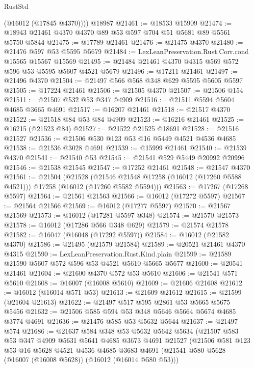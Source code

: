 \begin{lexlean}{RustStd}
\begin{coremodule}
        (@16012 (@17845 @4370))))
    @18987
@21461 := @18533 @15909
@21474 := @18943 @21461 @4370 @4370 @89 @53 @597 @704 @51 @5681 @89 @5561 @5750 @5844
@21475 := @17789 @21461
@21476 := @21475 @4370
@21480 := @21476 @597 @53 @5595 @5679
@21484 := LexLeanPreservation.Rust.Corr.cond @15565 @15567 @15569
@21495 := @21484 @21461 @4370 @4315 @569 @572 @596 @53 @5595 @5607 @4521 @5679
@21496 := @17211 @21461
@21497 := @21496 @4370
@21504 := @21497 @566 @568 @348 @629 @5595 @5605 @5597
@21505 := @17224 @21461
@21506 := @21505 @4370
@21507 := @21506 @154
@21511 := @21507 @532 @53 @347 @4909
@21516 := @21511 @5594 @5604 @4685 @3665 @4691
@21517 := @16207 @21461
@21518 := @21517 @4370
@21522 := @21518 @84 @53 @84 @4909
@21523 := @16216 @21461
@21525 := @16215 (@21523 @84)
@21527 := @21522 @21525 @18691
@21528 := @21516 @21527
@21536 := @21506 @530 @123 @53 @16 @5449 @4521 @4536 @4685
@21538 := @21536 @3028 @4691
@21539 := @15999 @21461
@21540 := @21539 @4370
@21541 := @21540 @53
@21545 := @21541 @529 @5449 @20992 @20996
@21546 := @21538 @21545
@21547 := @17252 @21461
@21548 := @21547 @4370
@21561 := @21504
    (@21528
      (@21546 @21548 @17258 (@16012 (@17260 @5588 @4521)))
      @17258
      (@16012 (@17260 @5582 @5594)))
@21563 := @17267 (@17268 @5597)
@21564 := @21561 @21563
@21566 := @16012 (@17272 @5597)
@21567 := @21564 @21566
@21569 := @16012 (@17277 @5597)
@21570 := @21567 @21569
@21573 := @16012 (@17281 @5597 @348)
@21574 := @21570 @21573
@21578 := @16012 (@17286 @566 @348 @629)
@21579 := @21574 @21578
@21582 := @16047 (@16048 (@17292 @5597))
@21584 := @16012 (@21582 @4370)
@21586 := @21495 (@21579 @21584)
@21589 := @20521 @21461 @4370 @4315
@21590 := LexLeanPreservation.Rust.Kind.plain
@21599 := @21589 @21590 @5607 @572 @596 @53 @4521 @5610 @5665 @5677
@21600 := @20541 @21461
@21604 := @21600 @4370 @572 @53 @5610
@21606 := @21541 @571 @5610
@21608 := @16007 (@16008 @5610)
@21609 := @21606 @21608
@21612 := @16012 (@16014 @571 @53)
@21613 := @21609 @21612
@21615 := @21599 (@21604 @21613)
@21622 := @21497 @517 @595 @2861 @53 @5665 @5675 @5456
@21632 := @21506 @585 @594 @53 @348 @5646 @5664 @5674 @4685 @3774 @4691
@21636 := @21476 @585 @53 @5632 @5644
@21637 := @21497 @574
@21686 := @21637
    @584
    @348
    @53
    @5632
    @5642
    @5634
    (@21507
      @583
      @53
      @347
      @4909
      @5631
      @5641
      @4685
      @3673
      @4691
      @21527
      (@21506
        @581
        @123
        @53
        @16
        @5628
        @4521
        @4536
        @4685
        @3683
        @4691
        (@21541 @580 @5628 (@16007 (@16008 @5628)) (@16012 (@16014 @580 @53)))

\end{coremodule}
\end{lexlean}

